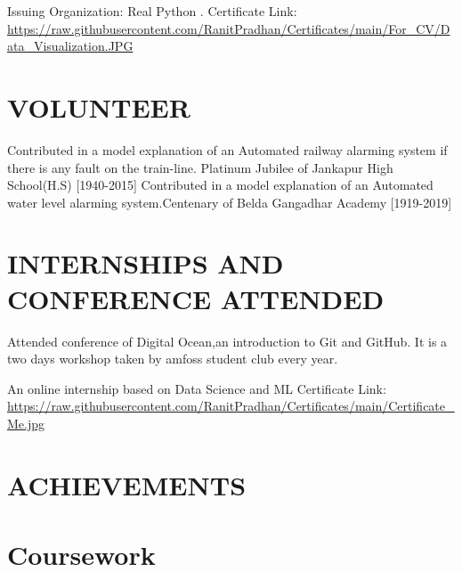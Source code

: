 \documentclass[11pt,a4paper,sans]{moderncv}        %
\begin{document}
{Issuing Organization: Real Python .{\newline}
Certificate Link: 
\url{https://raw.githubusercontent.com/RanitPradhan/Certificates/main/For_CV/Data_Visualization.JPG}}{}



\section{VOLUNTEER}
{Contributed in a model explanation of an Automated railway alarming system if there is any fault on the train-line. 
Platinum Jubilee of Jankapur High School(H.S) [1940-2015]}
{Contributed in a model explanation of an Automated water level alarming system.Centenary of Belda Gangadhar Academy  [1919-2019]}


\section{INTERNSHIPS AND CONFERENCE ATTENDED}
{Attended conference of Digital Ocean,an introduction to Git and GitHub. It is a two days workshop taken by amfoss student club every year.}

{An online internship based on Data Science and ML
Certificate Link: {\newline}
\url{https://raw.githubusercontent.com/RanitPradhan/Certificates/main/Certificate_Me.jpg }}{}

\section{ACHIEVEMENTS}

\section{Coursework}


\end{document}
